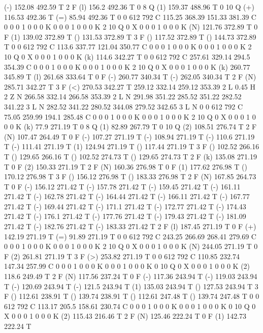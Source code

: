 (-) 152.08 492.59 T
2 F
(l) 156.2 492.36 T
0 8 Q
(1) 159.37 488.96 T
0 10 Q
(+) 116.53 492.36 T
(=) 85.94 492.36 T
0 0 612 792 C
115.25 368.39 151.33 381.39 C
0 0 0 1 0 0 0 K
0 0 0 1 0 0 0 K
2 10 Q
0 X
0 0 0 1 0 0 0 K
(N) 121.76 372.89 T
0 F
(1) 139.02 372.89 T
() 131.53 372.89 T
3 F
() 117.52 372.89 T
() 144.73 372.89 T
0 0 612 792 C
113.6 337.77 121.04 350.77 C
0 0 0 1 0 0 0 K
0 0 0 1 0 0 0 K
2 10 Q
0 X
0 0 0 1 0 0 0 K
(k) 114.6 342.27 T
0 0 612 792 C
257.61 329.14 294.5 354.39 C
0 0 0 1 0 0 0 K
0 0 0 1 0 0 0 K
2 10 Q
0 X
0 0 0 1 0 0 0 K
(k) 260.77 345.89 T
(l) 261.68 333.64 T
0 F
(-) 260.77 340.34 T
(-) 262.05 340.34 T
2 F
(N) 285.71 342.27 T
3 F
(<) 270.53 342.27 T
259.12 332.14 259.12 353.39 2 L
0.45 H
2 Z
N
266.58 332.14 266.58 353.39 2 L
N
291.98 351.22 285.52 351.22 282.52 341.22 3 L
N
282.52 341.22 280.52 344.08 279.52 342.65 3 L
N
0 0 612 792 C
75.05 259.99 194.1 285.48 C
0 0 0 1 0 0 0 K
0 0 0 1 0 0 0 K
2 10 Q
0 X
0 0 0 1 0 0 0 K
(k) 77.9 271.19 T
0 8 Q
(1) 82.89 267.79 T
0 10 Q
(2) 108.51 276.74 T
2 F
(N) 107.47 264.49 T
0 F
(-) 107.27 271.19 T
(-) 108.94 271.19 T
(-) 110.6 271.19 T
(-) 111.41 271.19 T
(1) 124.94 271.19 T
() 117.44 271.19 T
3 F
() 102.52 266.16 T
() 129.65 266.16 T
() 102.52 274.73 T
() 129.65 274.73 T
2 F
(k) 135.08 271.19 T
0 F
(2) 150.33 271.19 T
2 F
(N) 160.36 276.98 T
0 F
(1) 177.62 276.98 T
() 170.12 276.98 T
3 F
() 156.12 276.98 T
() 183.33 276.98 T
2 F
(N) 167.85 264.73 T
0 F
(-) 156.12 271.42 T
(-) 157.78 271.42 T
(-) 159.45 271.42 T
(-) 161.11 271.42 T
(-) 162.78 271.42 T
(-) 164.44 271.42 T
(-) 166.11 271.42 T
(-) 167.77 271.42 T
(-) 169.44 271.42 T
(-) 171.1 271.42 T
(-) 172.77 271.42 T
(-) 174.43 271.42 T
(-) 176.1 271.42 T
(-) 177.76 271.42 T
(-) 179.43 271.42 T
(-) 181.09 271.42 T
(-) 182.76 271.42 T
(-) 183.33 271.42 T
2 F
(l) 187.45 271.19 T
0 F
(+) 142.19 271.19 T
(=) 91.89 271.19 T
0 0 612 792 C
243.25 266.69 268.41 279.69 C
0 0 0 1 0 0 0 K
0 0 0 1 0 0 0 K
2 10 Q
0 X
0 0 0 1 0 0 0 K
(N) 244.05 271.19 T
0 F
(2) 261.81 271.19 T
3 F
(>) 253.82 271.19 T
0 0 612 792 C
110.85 232.74 147.34 257.99 C
0 0 0 1 0 0 0 K
0 0 0 1 0 0 0 K
0 10 Q
0 X
0 0 0 1 0 0 0 K
(2) 118.6 249.49 T
2 F
(N) 117.56 237.24 T
0 F
(-) 117.36 243.94 T
(-) 119.03 243.94 T
(-) 120.69 243.94 T
(-) 121.5 243.94 T
(1) 135.03 243.94 T
() 127.53 243.94 T
3 F
() 112.61 238.91 T
() 139.74 238.91 T
() 112.61 247.48 T
() 139.74 247.48 T
0 0 612 792 C
113.17 205.5 158.61 230.74 C
0 0 0 1 0 0 0 K
0 0 0 1 0 0 0 K
0 10 Q
0 X
0 0 0 1 0 0 0 K
(2) 115.43 216.46 T
2 F
(N) 125.46 222.24 T
0 F
(1) 142.73 222.24 T
